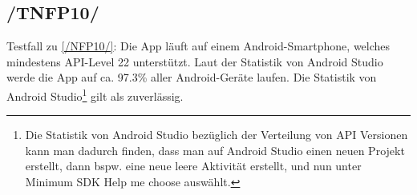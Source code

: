 \subsection*{/TNFP10/}
\label{/TNFP10/} Testfall zu \ref{/NFP10/}: Die App läuft auf einem \Gls{Android}-\Gls{Smartphone}, welches mindestens \Gls{API-Level} 22 unterstützt. Laut der Statistik von Android Studio werde die App auf ca. 97.3\% aller \Gls{Android}-Geräte laufen. Die Statistik von Android Studio\footnote{Die Statistik von Android Studio bezüglich der Verteilung von \Gls{API} Versionen kann man dadurch finden, dass man auf Android Studio einen neuen Projekt erstellt, dann bspw. eine neue leere Aktivität erstellt, und nun unter Minimum SDK \dq Help me choose\dq{} auswählt.} gilt als zuverlässig.